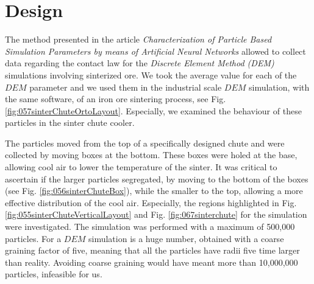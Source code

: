 

\section{Design}
\label{sec:design}



The method presented in the article \textit{Characterization of Particle Based Simulation Parameters
by means of Artificial Neural Networks} allowed to collect data
regarding the contact law
for the \textit{Discrete Element Method (DEM)} simulations involving sinterized
ore.
We took the average value for each of the $DEM$ parameter and we used them 
in the industrial scale $DEM$ simulation, with the same software, 
of an iron ore sintering process, see Fig. \ref{fig:057sinterChuteOrtoLayout}.
Especially, we examined the behaviour of these particles in the sinter chute
cooler.



The particles moved from the top of a specifically designed chute and were 
collected by moving boxes at the bottom. These boxes were holed at the base, 
allowing cool air to lower the temperature of the sinter. 
It was critical to ascertain if the larger particles segregated, 
by moving to the bottom of the boxes (see Fig. \ref{fig:056sinterChuteBox}), while the smaller to the top,
allowing a more effective distribution of the cool air. 
Especially, the regions
highlighted in Fig. \ref{fig:055sinterChuteVerticalLayout} and
Fig. \ref{fig:067sinterchute} for the simulation were investigated.
The simulation was performed with a maximum of 500,000 particles.
For a $DEM$ simulation is a huge number, obtained with a coarse graining factor
of five, meaning that all the particles have radii five time larger than reality.
Avoiding coarse graining would have meant more than 10,000,000 particles,
infeasible for us.




